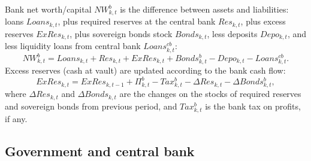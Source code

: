 \documentclass[a4paper,11pt]{article}
\begin{document}
\begin{appendices}
Bank net worth/capital $NW^b_{k,t}$ is the difference between assets and liabilities: loans $Loans_{k,t}$, plus required reserves at the central bank $Res_{k,t}$, plus excess reserves $ExRes_{k,t}$, plus sovereign bonds stock $Bonds_{k,t}$, less deposits $Depo_{k,t}$, and less liquidity loans from central bank $Loans^{cb}_{k,t}$:
\begin{equation}
	NW_{k,t}^b = Loans_{k,t} + Res_{k,t} + ExRes_{k,t} + Bonds_{k,t}^b - Depo_{k,t} - Loans_{k,t}^{cb}.
\end{equation}
Excess reserves (cash at vault) are updated according to the bank cash flow:
\begin{equation}
	ExRes_{k,t} = ExRes_{k,t-1} + \Pi_{k,t}^b - Tax_{k,t}^b - \Delta Res_{k,t} - \Delta Bonds_{k,t}^b,
\end{equation}
where $\Delta Res_{k,t}$ and $\Delta Bonds_{k,t}$ are the changes on the stocks of required reserves and sovereign bonds from previous period, and $Tax^b_{k,t}$ is the bank tax on profits, if any.


\subsection*{Government and central bank}


\end{appendices}
\end{document}

